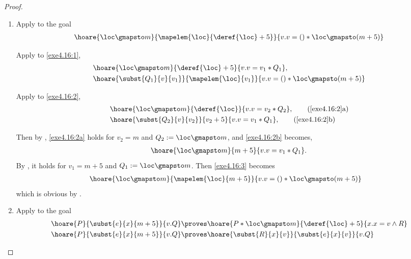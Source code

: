 \begin{proof}
  \begin{enumerate}
    \item \label{exe4.16.1} 
      Apply  to the goal
      \begin{align}
        \hoare{\loc \gmapsto m}{\mapelem{\loc}{\deref{\loc} + 5}}
        {v.v = () * \loc \gmapsto (m + 5)} \label{exe4.16:1}
      \end{align}
      
      Apply  to \eqref{exe4.16:1},
      \begin{align}
        & \hoare{\loc \gmapsto m}{\deref{\loc} + 5}{v.v = v_1 * Q_1},
        \label{exe4.16:2} \\
        & \hoare{\subst{Q_1}{v}{v_1}}{\mapelem{\loc}{v_1}}
        {v.v = () * \loc \gmapsto (m + 5)} \label{exe4.16:3}
      \end{align}

      Apply  to \eqref{exe4.16:2},
      \begin{align}
        & \hoare{\loc \gmapsto m}{\deref{\loc}}{v.v = v_2 * Q_2},
        \tag{\ref{exe4.16:2}a} \label{exe4.16:2a} \\
        & \hoare{\subst{Q_2}{v}{v_2}}{v_2 + 5}{v.v = v_1 * Q_1},
        \tag{\ref{exe4.16:2}b} \label{exe4.16:2b}
      \end{align}

      Then by , \eqref{exe4.16:2a} holds for
      $v_2 = m$ and $Q_2 := \loc \gmapsto m$, and \eqref{exe4.16:2b}
      becomes,
      \begin{align*}
        \hoare{\loc \gmapsto m}{m + 5}{v.v = v_1 * Q_1}.
      \end{align*}
      By , it holds for $v_1 = m + 5$ and $Q_1 := 
      \loc \gmapsto m$. Then \eqref{exe4.16:3} becomes
      \begin{align*}
        & \hoare{\loc \gmapsto m}{\mapelem{\loc}{m + 5}}
        {v.v = () * \loc \gmapsto (m + 5)} 
      \end{align*}
      which is obvious by .

    \item Apply  to the goal
      \begin{align}
        \hoare{P}{\subst{e}{x}{m + 5}}{v.Q} \proves &
        \hoare{P * \loc \gmapsto m}{\deref{\loc} + 5}{x.x = v \wedge R}
        \label{exe4.16:4} \\
        \hoare{P}{\subst{e}{x}{m + 5}}{v.Q} \proves &
        \hoare{\subst{R}{x}{v}}{\subst{e}{x}{v}}{v.Q}
        \label{exe4.16:5}
      \end{align}


\end{enumerate}
\end{proof}
